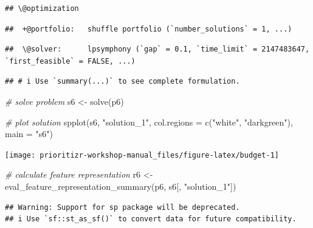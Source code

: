 \documentclass[
  12pt,
]{book}
\newenvironment{Shaded}{\begin{snugshade}}{\end{snugshade}}
\newcommand{\AttributeTok}[1]{\textcolor[rgb]{0.77,0.63,0.00}{#1}}
\newcommand{\CommentTok}[1]{\textcolor[rgb]{0.56,0.35,0.01}{\textit{#1}}}
\newcommand{\ConstantTok}[1]{\textcolor[rgb]{0.00,0.00,0.00}{#1}}
\newcommand{\FloatTok}[1]{\textcolor[rgb]{0.00,0.00,0.81}{#1}}
\newcommand{\FunctionTok}[1]{\textcolor[rgb]{0.00,0.00,0.00}{#1}}
\newcommand{\NormalTok}[1]{#1}
\newcommand{\OtherTok}[1]{\textcolor[rgb]{0.56,0.35,0.01}{#1}}
\newcommand{\SpecialCharTok}[1]{\textcolor[rgb]{0.00,0.00,0.00}{#1}}
\newcommand{\StringTok}[1]{\textcolor[rgb]{0.31,0.60,0.02}{#1}}
\begin{document}
\begin{verbatim}
## \@optimization
\end{verbatim}

\begin{verbatim}
##  +@portfolio:   shuffle portfolio (`number_solutions` = 1, ...)
\end{verbatim}

\begin{verbatim}
##  \@solver:      lpsymphony (`gap` = 0.1, `time_limit` = 2147483647, `first_feasible` = FALSE, ...)
\end{verbatim}

\begin{verbatim}
## # i Use `summary(...)` to see complete formulation.
\end{verbatim}

\begin{Shaded}
\begin{Highlighting}[]
\CommentTok{\# solve problem}
\NormalTok{s6 }\OtherTok{\textless{}{-}} \FunctionTok{solve}\NormalTok{(p6)}

\CommentTok{\# plot solution}
\FunctionTok{spplot}\NormalTok{(s6, }\StringTok{"solution\_1"}\NormalTok{, }\AttributeTok{col.regions =} \FunctionTok{c}\NormalTok{(}\StringTok{"white"}\NormalTok{, }\StringTok{"darkgreen"}\NormalTok{), }\AttributeTok{main =} \StringTok{"s6"}\NormalTok{)}
\end{Highlighting}
\end{Shaded}

\begin{center}\texttt{[image: prioritizr-workshop-manual\_files/figure-latex/budget-1]} \end{center}

\begin{Shaded}
\begin{Highlighting}[]
\CommentTok{\# calculate feature representation}
\NormalTok{r6 }\OtherTok{\textless{}{-}} \FunctionTok{eval\_feature\_representation\_summary}\NormalTok{(p6, s6[, }\StringTok{"solution\_1"}\NormalTok{])}
\end{Highlighting}
\end{Shaded}

\begin{verbatim}
## Warning: Support for sp package will be deprecated.
## i Use `sf::st_as_sf()` to convert data for future compatibility.
\end{verbatim}

\begin{Shaded}
\end{Shaded}
\end{document}

